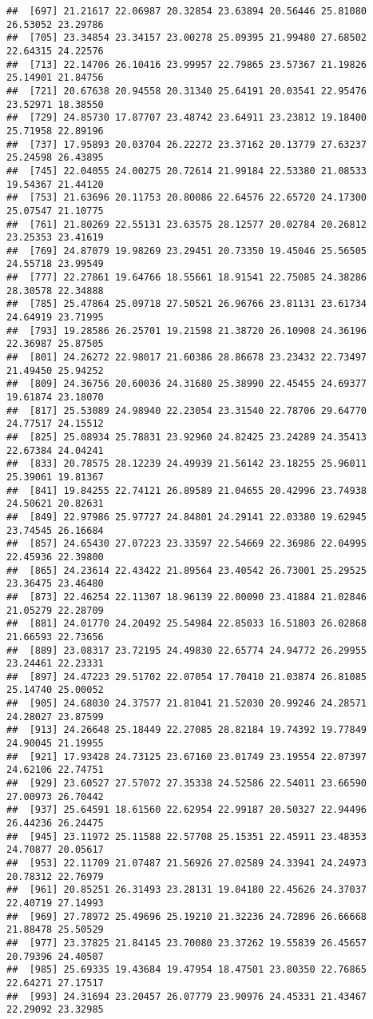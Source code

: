 \documentclass[
]{article}
\begin{document}
\begin{verbatim}
##  [697] 21.21617 22.06987 20.32854 23.63894 20.56446 25.81080 26.53052 23.29786
##  [705] 23.34854 23.34157 23.00278 25.09395 21.99480 27.68502 22.64315 24.22576
##  [713] 22.14706 26.10416 23.99957 22.79865 23.57367 21.19826 25.14901 21.84756
##  [721] 20.67638 20.94558 20.31340 25.64191 20.03541 22.95476 23.52971 18.38550
##  [729] 24.85730 17.87707 23.48742 23.64911 23.23812 19.18400 25.71958 22.89196
##  [737] 17.95893 20.03704 26.22272 23.37162 20.13779 27.63237 25.24598 26.43895
##  [745] 22.04055 24.00275 20.72614 21.99184 22.53380 21.08533 19.54367 21.44120
##  [753] 21.63696 20.11753 20.80086 22.64576 22.65720 24.17300 25.07547 21.10775
##  [761] 21.80269 22.55131 23.63575 28.12577 20.02784 20.26812 23.25353 23.41619
##  [769] 24.87079 19.98269 23.29451 20.73350 19.45046 25.56505 24.55718 23.99549
##  [777] 22.27861 19.64766 18.55661 18.91541 22.75085 24.38286 28.30578 22.34888
##  [785] 25.47864 25.09718 27.50521 26.96766 23.81131 23.61734 24.64919 23.71995
##  [793] 19.28586 26.25701 19.21598 21.38720 26.10908 24.36196 22.36987 25.87505
##  [801] 24.26272 22.98017 21.60386 28.86678 23.23432 22.73497 21.49450 25.94252
##  [809] 24.36756 20.60036 24.31680 25.38990 22.45455 24.69377 19.61874 23.18070
##  [817] 25.53089 24.98940 22.23054 23.31540 22.78706 29.64770 24.77517 24.15512
##  [825] 25.08934 25.78831 23.92960 24.82425 23.24289 24.35413 22.67384 24.04241
##  [833] 20.78575 28.12239 24.49939 21.56142 23.18255 25.96011 25.39061 19.81367
##  [841] 19.84255 22.74121 26.89589 21.04655 20.42996 23.74938 24.50621 20.82631
##  [849] 22.97986 25.97727 24.84801 24.29141 22.03380 19.62945 23.74545 26.16684
##  [857] 24.65430 27.07223 23.33597 22.54669 22.36986 22.04995 22.45936 22.39800
##  [865] 24.23614 22.43422 21.89564 23.40542 26.73001 25.29525 23.36475 23.46480
##  [873] 22.46254 22.11307 18.96139 22.00090 23.41884 21.02846 21.05279 22.28709
##  [881] 24.01770 24.20492 25.54984 22.85033 16.51803 26.02868 21.66593 22.73656
##  [889] 23.08317 23.72195 24.49830 22.65774 24.94772 26.29955 23.24461 22.23331
##  [897] 24.47223 29.51702 22.07054 17.70410 21.03874 26.81085 25.14740 25.00052
##  [905] 24.68030 24.37577 21.81041 21.52030 20.99246 24.28571 24.28027 23.87599
##  [913] 24.26648 25.18449 22.27085 28.82184 19.74392 19.77849 24.90045 21.19955
##  [921] 17.93428 24.73125 23.67160 23.01749 23.19554 22.07397 24.62106 22.74751
##  [929] 23.60527 27.57072 27.35338 24.52586 22.54011 23.66590 27.00973 26.70442
##  [937] 25.64591 18.61560 22.62954 22.99187 20.50327 22.94496 26.44236 26.24475
##  [945] 23.11972 25.11588 22.57708 25.15351 22.45911 23.48353 24.70877 20.05617
##  [953] 22.11709 21.07487 21.56926 27.02589 24.33941 24.24973 20.78312 22.76979
##  [961] 20.85251 26.31493 23.28131 19.04180 22.45626 24.37037 22.40719 27.14993
##  [969] 27.78972 25.49696 25.19210 21.32236 24.72896 26.66668 21.88478 25.50529
##  [977] 23.37825 21.84145 23.70080 23.37262 19.55839 26.45657 20.79396 24.40507
##  [985] 25.69335 19.43684 19.47954 18.47501 23.80350 22.76865 22.64271 27.17517
##  [993] 24.31694 23.20457 26.07779 23.90976 24.45331 21.43467 22.29092 23.32985
\end{verbatim}
\end{document}
